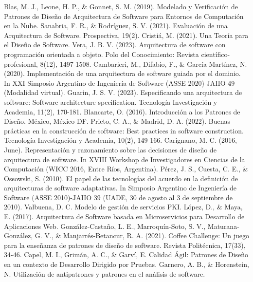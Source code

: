 \documentclass[conference]{IEEEtran}
\begin{document}
\begin{thebibliography}{99}
 Blas, M. J., Leone, H. P., \& Gonnet, S. M. (2019). Modelado y Verificación de Patrones de Diseño de Arquitectura de Software para Entornos de Computación en la Nube.
 Sanabria, F. R., \& Rodríguez, S. V. (2021). Evaluación de una Arquitectura de Software. Prospectiva, 19(2).
 Cristiá, M. (2021). Una Teoría para el Diseño de Software.
 Vera, J. B. V. (2023). Arquitectura de software con programación orientada a objeto. Polo del Conocimiento: Revista científico-profesional, 8(12), 1497-1508.
 Cambarieri, M., Difabio, F., \& García Martínez, N. (2020). Implementación de una arquitectura de software guiada por el dominio. In XXI Simposio Argentino de Ingeniería de Software (ASSE 2020)-JAIIO 49 (Modalidad virtual).
 Guarin, J. S. V. (2023). Especificando una arquitectura de software: Software architecture specification. Tecnología Investigación y Academia, 11(2), 170-181.
 Blancarte, O. (2016). Introducción a los Patrones de Diseño. México, México DF.
 Prieto, C. A., \& Madrid, D. A. (2022). Buenas prácticas en la construcción de software: Best practices in software construction. Tecnología Investigación y Academia, 10(2), 149-166.
 Carignano, M. C. (2016, June). Representación y razonamiento sobre las decisiones de diseño de arquitectura de software. In XVIII Workshop de Investigadores en Ciencias de la Computación (WICC 2016, Entre Ríos, Argentina).
 Pérez, J. S., Cuesta, C. E., \& Ossowski, S. (2010). El papel de las tecnologías del acuerdo en la definición de arquitecturas de software adaptativas. In Simposio Argentino de Ingeniería de Software (ASSE 2010)-JAIIO 39 (UADE, 30 de agosto al 3 de septiembre de 2010).
 Valbuena, D. C. Modelo de gestión de servicios PKI.
 López, D., \& Maya, E. (2017). Arquitectura de Software basada en Microservicios para Desarrollo de Aplicaciones Web.
 González-Castaño, L. E., Marroquín-Soto, S. V., Maturana-González, G. V., \& Manjarrés-Betancur, R. A. (2021). Coffee Challenge: Un juego para la enseñanza de patrones de diseño de software. Revista Politécnica, 17(33), 34-46.
 Capel, M. I., Grimán, A. C., \& Garví, E. Calidad Ágil: Patrones de Diseño en un contexto de Desarrollo Dirigido por Pruebas.
 Garnero, A. B., \& Horenstein, N. Utilización de antipatrones y patrones en el análisis de software.

\end{thebibliography}
\end{document}
